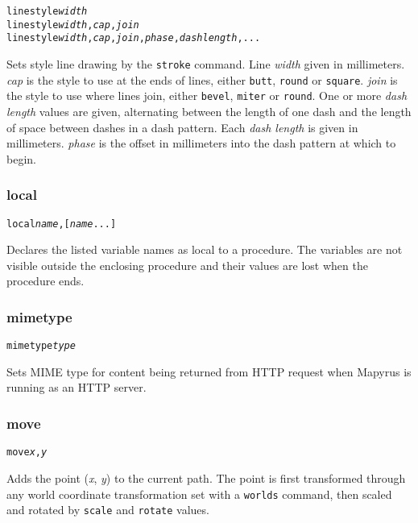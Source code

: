 \begin{alltt}
linestyle \textit{width}
linestyle \textit{width}, \textit{cap}, \textit{join}
linestyle \textit{width}, \textit{cap}, \textit{join}, \textit{phase}, \textit{dash length}, ...
\end{alltt}

Sets style line drawing by the \texttt{stroke}
command.
Line \textit{width} given in millimeters.
\textit{cap} is the style to use at the ends of lines, either
\texttt{butt}, \texttt{round} or \texttt{square}.
\textit{join} is the style to use where lines join, either
\texttt{bevel}, \texttt{miter} or \texttt{round}.
One or more \textit{dash length} values are given, alternating
between the length of one dash and the length of space between
dashes in a dash pattern.  Each \textit{dash length} is given in millimeters.
\textit{phase} is the offset in millimeters into the dash pattern 
at which to begin.

\subsubsection{local}

\begin{alltt}
local \textit{name}, [\textit{name} ...]
\end{alltt}

Declares the listed variable names as local to a procedure.
The variables are not visible outside the enclosing procedure
and their values are lost when the procedure ends.

\subsubsection{mimetype}

\begin{alltt}
mimetype \textit{type}
\end{alltt}

Sets MIME type for content being returned from HTTP request
when Mapyrus is running as an HTTP server.

\subsubsection{move}

\begin{alltt}
move \textit{x}, \textit{y}
\end{alltt}

Adds the point (\textit{x}, \textit{y}) to the current path.  The
point is first transformed through any world coordinate
transformation set with a \texttt{worlds} command,
then scaled and rotated by \texttt{scale}
and \texttt{rotate} values.

